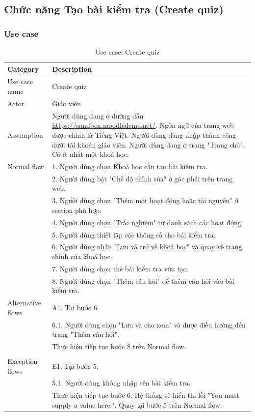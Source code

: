 \documentclass[a4paper, 12pt]{article}
\begin{document}
\subsection{Chức năng Tạo bài kiểm tra (Create quiz)}
\subsubsection{Use case}

\begin{table}[H]
    \centering
    \begin{tabular}{|l|p{11cm}|}
        \hline
        Category & Description \\
        \hline
        Use case name & Create quiz \\
        \hline
        Actor & Giáo viên \\
        \hline
        Assumption & Người dùng đang ở đường dẫn \url{https://sandbox.moodledemo.net/}. Ngôn ngữ của trang web được chỉnh là Tiếng Việt. Người dùng đăng nhập thành công dưới tài khoản giáo viên. Người dùng đang ở trang "Trang chủ". Có ít nhất một khoá học.\\\hline
        Normal flow & 
        1. Người dùng chọn Khoá học cần tạo bài kiểm tra. \\
        & 2. Người dùng bật "Chế độ chỉnh sửa" ở góc phải trên trang web. \\
        & 3. Người dùng chọn "Thêm một hoạt động hoặc tài nguyên" ở section phù hợp.\\
        & 4. Người dùng chọn "Trắc nghiệm" từ danh sách các hoạt động.\\
        & 5. Người dùng thiết lập các thông số cho bài kiểm tra.\\
        & 6. Người dùng nhấn "Lưu và trở về khoá học" và quay về trang chính của khoá học.\\
        & 7. Người dùng chọn thẻ bài kiểm tra vừa tạo.\\
        & 8. Người dùng chọn "Thêm câu hỏi" để thêm câu hỏi vào bài kiểm tra.\\\hline
        Alternative flows &
        A1. Tại bước 6:\\
        & 6.1. Người dùng chọn "Lưu và cho xem" và được điều hướng đến trang "Thêm câu hỏi".\\
        & Thực hiện tiếp tục bước 8 trên Normal flow.\\
        \\\hline
        Exception flows &
        E1. Tại bước 5:\\
        & 5.1. Người dùng không nhập tên bài kiểm tra.\\
        & Thực hiện tiếp tục bước 6. Hệ thống sẽ hiển thị lỗi "You must supply a value here.". Quay lại bước 5 trên Normal flow.\\\hline
    \end{tabular}
    \caption{Use case: Create quiz}
    \label{tab:create-quiz}
\end{table}
\end{document}
